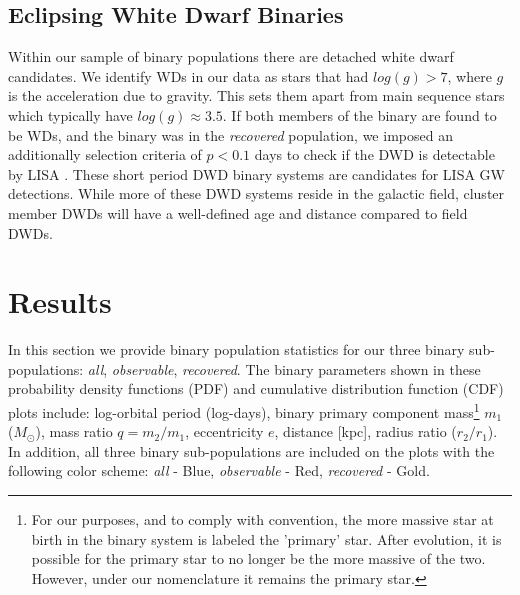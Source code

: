 \documentclass[twocolumn]{aastex63}
\begin{document}
\subsection{Eclipsing White Dwarf Binaries} \label{subsec:wd}

Within our sample of binary populations there are detached white dwarf candidates. 
We identify WDs in our data as stars that had $log(g) > 7$, where $g$ is the acceleration due to gravity. This sets them apart from main sequence stars which typically have $log(g) \approx 3.5$. If both members of the binary are found to be WDs, and the binary was in the \textit{recovered} population, we imposed an additionally selection criteria of $p < 0.1$ days to check if the DWD is detectable by LISA \citep{2017MNRAS.470.1894K}. These short period DWD binary systems are candidates for LISA GW detections. While more of these DWD systems reside in the galactic field, cluster member DWDs will have a well-defined age and distance compared to field DWDs. 


\section{Results} \label{sec:Results}
In this section we provide binary population statistics for our three binary sub-populations: \textit{all}, \textit{observable}, \textit{recovered}. The binary parameters shown in these probability density functions (PDF) and cumulative distribution function (CDF) plots include: log-orbital period (log-days), binary primary component mass\footnote{For our purposes, and to comply with convention, the more massive star  at birth in the binary system is labeled the 'primary' star. After evolution, it is possible for the primary star to no longer be the more massive of the two. However, under our nomenclature it remains the primary star.} \textit{$m_1$} ($M_{\odot}$), mass ratio $q=m_2/m_1$, eccentricity $e$, distance [kpc], radius ratio ($r_2/r_1$). In addition, all three binary sub-populations are included on the plots with the following color scheme: \textit{all} - Blue, \textit{observable} - Red, \textit{recovered} - Gold.
\end{document}
